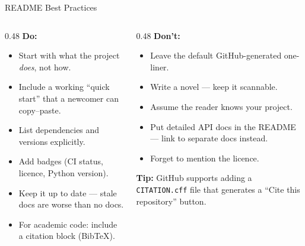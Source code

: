 \documentclass[aspectratio=169, 11pt]{beamer}
\begin{document}
\begin{frame}{README Best Practices}
  \begin{columns}[T]
    \begin{column}{0.48\textwidth}
      \textbf{Do:}
      \begin{itemize}
        \item Start with what the project \emph{does}, not how.
        \item Include a working ``quick start'' that a newcomer can copy--paste.
        \item List dependencies and versions explicitly.
        \item Add badges (CI status, licence, Python version).
        \item Keep it up to date --- stale docs are worse than no docs.
        \item For academic code: include a citation block (BibTeX).
      \end{itemize}
    \end{column}
    \begin{column}{0.48\textwidth}
      \textbf{Don't:}
      \begin{itemize}
        \item Leave the default GitHub-generated one-liner.
        \item Write a novel --- keep it scannable.
        \item Assume the reader knows your project.
        \item Put detailed API docs in the README --- link to separate docs instead.
        \item Forget to mention the licence.
      \end{itemize}

      \vspace{0.5em}
      \textbf{Tip:} GitHub supports adding a \texttt{CITATION.cff} file that generates a ``Cite this repository'' button.
    \end{column}
  \end{columns}
\end{frame}
\end{document}
